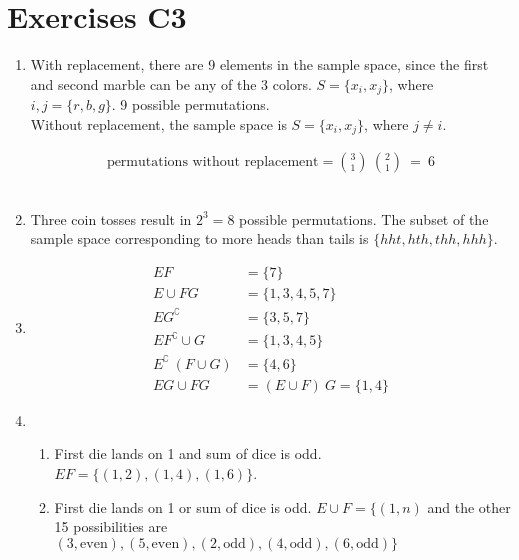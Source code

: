 \chapter*{Exercises C3}

\begin{enumerate}
	\item With replacement, there are 9 elements in the sample space, since the first and second marble can be any of the 3 colors. $ S = \{ x_i, x_j \} $, where $ i, j = \{ r, b, g \} $. 9 possible permutations. \\
	
	Without replacement, the sample space is $ S = \{ x_i, x_j \} $, where $ j \neq i $.
	
	\begin{align}
		\text{permutations without replacement} =  \binom{3}{1} \ \binom{2}{1} \ = \ 6
	\end{align} \\
	
	\item Three coin tosses result in $ 2^3  = 8$ possible permutations. The subset of the sample space corresponding to more heads than tails is $ \{ hht, hth, thh, hhh \} $. \\
	
	\item 	\begin{subequations}
		\begin{align}
			E F &= \{ 7 \} \\
			E \cup FG &= \{ 1, 3, 4, 5, 7 \} \\
			E G^\complement &= \{ 3, 5, 7 \} \\
			E F^\complement \cup G &= \{ 1, 3, 4, 5 \} \\
			E^\complement \  ( F \cup G ) &= \{ 4, 6 \} \\
			EG \cup FG &= (E \cup F) \ G = \{ 1, 4 \}
		\end{align}	
	\end{subequations}
	
	\item \begin{enumerate}
		\item First die lands on 1 and sum of dice is odd. $ EF  = \{ (1,2), (1,4), (1,6) \}$. \\
		
		\item First die lands on 1 or sum of dice is odd. $ E \cup F = \{ (1, n) $ and the other 15 possibilities are $ (3, \text{even}), (5, \text{even}), (2, \text{odd}), (4, \text{odd}), (6, \text{odd}) \} $ \\
		

\end{enumerate}
\end{enumerate}
